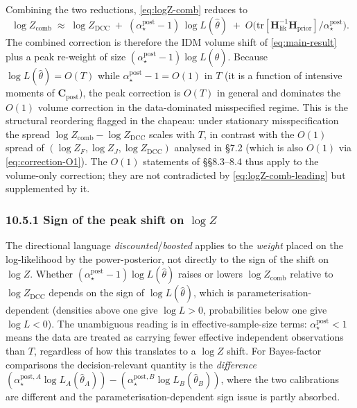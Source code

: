 \documentclass[11pt]{article}
\begin{document}
Combining the two reductions, \eqref{eq:logZ-comb} reduces to
\begin{equation}
\log Z_{\mathrm{comb}}
\;\approx\;
\log Z_{\mathrm{DCC}}
\;+\;
(\alpha_\star^{\mathrm{post}} - 1)\,\log L(\hat\theta)
\;+\;
O\!\bigl(\mathrm{tr}[\mathbf H_{\mathrm{lik}}^{-1}\mathbf H_{\mathrm{prior}}]/
\alpha_\star^{\mathrm{post}}\bigr).
\label{eq:logZ-comb-leading}
\end{equation}
The combined correction is therefore the IDM volume shift of
\eqref{eq:main-result} plus a peak re-weight of size
$(\alpha_\star^{\mathrm{post}} - 1)\log L(\hat\theta)$. Because
$\log L(\hat\theta) = O(T)$ while
$\alpha_\star^{\mathrm{post}} - 1 = O(1)$ in $T$ (it is a function of
intensive moments of $\mathbf C_{\mathrm{post}}$), the peak correction is
$O(T)$ in general and dominates the $O(1)$ volume correction in the
data-dominated misspecified regime. This is the structural reordering flagged
in the chapeau: under stationary misspecification the spread
$\log Z_{\mathrm{comb}} - \log Z_{\mathrm{DCC}}$ scales with $T$, in contrast
with the $O(1)$ spread of $(\log Z_F, \log Z_J, \log Z_{\mathrm{DCC}})$
analysed in \S7.2 (which is also $O(1)$ via \eqref{eq:correction-O1}). The
$O(1)$ statements of \S\S8.3--8.4 thus apply to the volume-only correction;
they are not contradicted by \eqref{eq:logZ-comb-leading} but supplemented by
it.

\subsubsection*{10.5.1 Sign of the peak shift on $\log Z$}

The directional language \emph{discounted}/\emph{boosted} applies to the
\emph{weight} placed on the log-likelihood by the power-posterior, not
directly to the sign of the shift on $\log Z$. Whether
$(\alpha_\star^{\mathrm{post}} - 1)\log L(\hat\theta)$ raises or lowers
$\log Z_{\mathrm{comb}}$ relative to $\log Z_{\mathrm{DCC}}$ depends on the
sign of $\log L(\hat\theta)$, which is parameterisation-dependent (densities
above one give $\log L > 0$, probabilities below one give $\log L < 0$). The
unambiguous reading is in effective-sample-size terms:
$\alpha_\star^{\mathrm{post}} < 1$ means the data are treated as carrying
fewer effective independent observations than $T$, regardless of how this
translates to a $\log Z$ shift. For Bayes-factor comparisons the
decision-relevant quantity is the \emph{difference}
$(\alpha_\star^{\mathrm{post}, A} \log L_A(\hat\theta_A))
- (\alpha_\star^{\mathrm{post}, B} \log L_B(\hat\theta_B))$, where the
two calibrations are different and the parameterisation-dependent sign
issue is partly absorbed.
\end{document}
